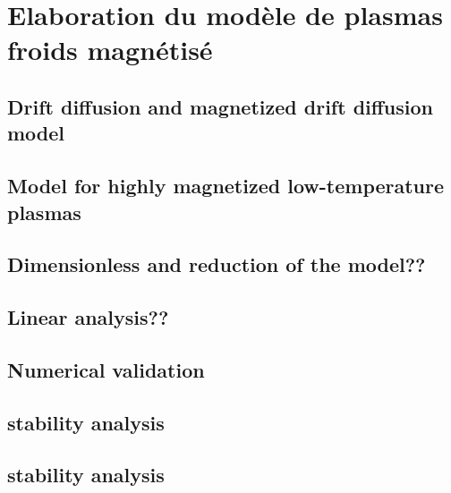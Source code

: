 	\section{Elaboration du modèle de plasmas froids magnétisé}
		\subsection{Drift diffusion and magnetized drift diffusion model}
		\subsection{Model for highly magnetized low-temperature plasmas}
		\subsection{Dimensionless and reduction of the model??}
		\subsection{Linear analysis??}
		\subsection{Numerical validation}
		\subsection{stability analysis}
		\subsection{stability analysis}
